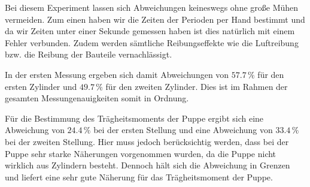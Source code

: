 Bei diesem Experiment lassen sich Abweichungen keineswegs ohne große Mühen vermeiden.
Zum einen haben wir die Zeiten der Perioden per Hand bestimmt und da wir Zeiten unter einer
Sekunde gemessen haben ist dies natürlich mit einem Fehler verbunden.
Zudem werden sämtliche Reibungseffekte wie die Luftreibung bzw. die Reibung der Bauteile
vernachlässigt.

In der ersten Messung ergeben sich damit Abweichungen von  $57.7\,\%$ für den ersten Zylinder
und $49.7\,\%$ für den zweiten Zylinder. Dies ist im Rahmen der gesamten Messungenauigkeiten
somit in Ordnung.

Für die Bestimmung des Trägheitsmoments der Puppe ergibt sich eine Abweichung von $24.4\,\%$ bei der
ersten Stellung und eine Abweichung von $33.4\,\%$ bei der zweiten Stellung.
Hier muss jedoch berücksichtig werden, dass bei der Puppe sehr starke Näherungen vorgenommen
wurden, da die Puppe nicht wirklich aus Zylindern besteht. Dennoch hält sich die Abweichung
in Grenzen und liefert eine sehr gute Näherung für das Trägheitsmoment der Puppe.
